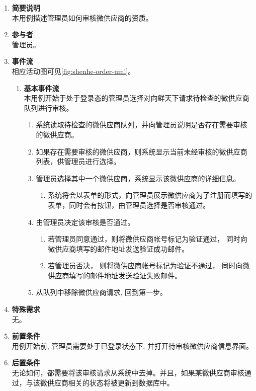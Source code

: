 \begin{enumerate}
	\item \textbf{简要说明}  \\ 本用例描述管理员如何审核微供应商的资质。
	\item \textbf{参与者} \\ 管理员。
	\item \textbf{事件流} \\ 相应活动图可见\autoref{fig:shenhe-order-uml}。
	\begin{enumerate} 
        \item \textbf{基本事件流} \\ 本用例开始于处于登录态的管理员选择对向鲜天下请求待检查的微供应商队列进行审核。
        \begin{enumerate}
            \item 系统读取待检查的微供应商队列，并向管理员说明是否存在需要审核的微供应商。
            \item 如果存在需要审核的微供应商，则系统显示当前未经审核的微供应商列表，供管理员进行选择。
            \item 管理员选择其中一个微供应商，系统显示该微供应商的详细信息。
            \begin{enumerate}
                \item 系统将会以表单的形式，向管理员展示微供应商为了注册而填写的表单，同时会有按钮，由管理员选择是否审核通过。
            \end{enumerate}
            \item 由管理员决定该审核是否通过。
            \begin{enumerate}
                \item 若管理员同意通过，则将微供应商帐号标记为验证通过， 同时向微供应商填写的邮件地址发送验证成功邮件。
                \item 若管理员否决， 则将微供应商帐号标记为验证不通过， 同时向微供应商填写的邮件地址发送验证失败邮件。
            \end{enumerate}
            \item 从队列中移除微供应商请求, 回到第一步。
        \end{enumerate}
    \end{enumerate}
    \item \textbf{特殊需求} \\ 无。
    \item \textbf{前置条件} \\ 用例开始前, 管理员需要处于已登录状态下, 并打开待审核微供应商信息界面。
    \item \textbf{后置条件} \\ 无论如何，都需要将该审核请求从系统中去掉。并且，如果某微供应商审核通过，与该微供应商相关的状态将被更新到数据库中。
\end{enumerate}



